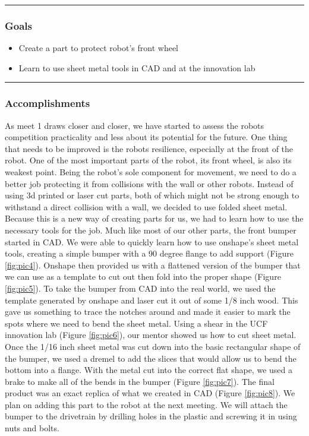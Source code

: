 \noindent\hfil\rule{\textwidth}{.4pt}\hfil
\subsubsection*{Goals}
\begin{itemize}
    \item Create a part to protect robot’s front wheel
    \item Learn to use sheet metal tools in CAD and at the innovation lab
\end{itemize} 

\noindent\hfil\rule{\textwidth}{.4pt}\hfil

\subsubsection*{Accomplishments}
As meet 1 draws closer and closer, we have started to assess the robots competition practicality and less about its potential for the future. One thing that needs to be improved is the robots resilience, especially at the front of the robot. One of the most important parts of the robot, its front wheel, is also its weakest point. Being the robot’s sole component for movement, we need to do a better job protecting it from collisions with the wall or other robots. Instead of using 3d printed or laser cut parts, both of which might not be strong enough to withstand a direct collision with a wall, we decided to use folded sheet metal. 
Because this is a new way of creating parts for us, we had to learn how to use the necessary tools for the job. Much like most of our other parts, the front bumper started in CAD. We were able to quickly learn how to use onshape’s sheet metal tools, creating a simple bumper with a 90 degree flange to add support (Figure \ref{fig:pic4}). Onshape then provided us with a flattened version of the bumper that we can use as a template to cut out then fold into the proper shape (Figure \ref{fig:pic5}).
To take the bumper from CAD into the real world, we used the template generated by onshape and laser cut it out of some 1/8 inch wood. This gave us something to trace the notches around and made it easier to mark the spots where we need to bend the sheet metal. Using a shear in the UCF innovation lab (Figure \ref{fig:pic6}), our mentor showed us how to cut sheet metal. Once the 1/16 inch sheet metal was cut down into the basic rectangular shape of the bumper, we used a dremel to add the slices that would allow us to bend the bottom into a flange. With the metal cut into the correct flat shape, we used a brake to make all of the bends in the bumper (Figure \ref{fig:pic7}). The final product was an exact replica of what we created in CAD (Figure \ref{fig:pic8}). We plan on adding this part to the robot at the next meeting. We will attach the bumper to the drivetrain by drilling holes in the plastic and screwing it in using nuts and bolts.

